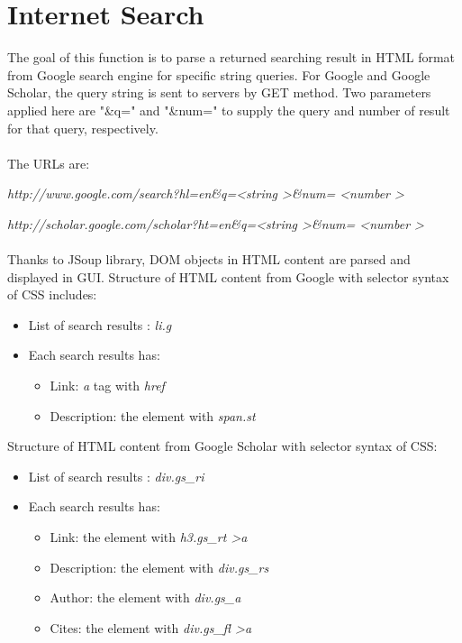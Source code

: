 \documentclass[a4paper,12pt,oneside]{report}
\begin{document}
		\section{Internet Search}
		The goal of this function is to parse a returned searching result in HTML format from Google search engine for specific string queries.
		For Google and Google Scholar, the query string is sent to servers by GET method. Two parameters applied here are "\&q=" and "\&num=" to supply the query and number of result for that query, respectively.\\\\
		The URLs are:\par
		\textit{http://www.google.com/search?hl=en\&q=\textless string \textgreater\&num= \textless number \textgreater}\par
		\textit{http://scholar.google.com/scholar?ht=en\&q=\textless string \textgreater\&num= \textless number \textgreater}\\\\
		Thanks to JSoup library, DOM objects in HTML content are parsed and displayed in GUI.
		Structure of HTML content from Google with selector syntax of CSS includes:\par
		\begin {itemize}
		\item List of search results : \textit{li.g}\par
		\item Each search results has:
		\begin {itemize}
			\item Link: \textit{a} tag with \textit{href}
			\item Description: the element with \textit{span.st}
		\end{itemize}
		\end{itemize}
		Structure of HTML content from Google Scholar with selector syntax of CSS:\par
		\begin{itemize}
		\item List of search results : \textit{div.gs\_ri} \par
		\item Each search results has:
		\begin {itemize}
			\item Link: the element with \textit{h3.gs\_rt \textgreater a} 
			\item Description: the element with \textit{div.gs\_rs}
			\item Author: the element with \textit{div.gs\_a}
			\item Cites: the element with \textit{div.gs\_fl \textgreater a}
		\end{itemize}
		\end{itemize}
\end{document}
